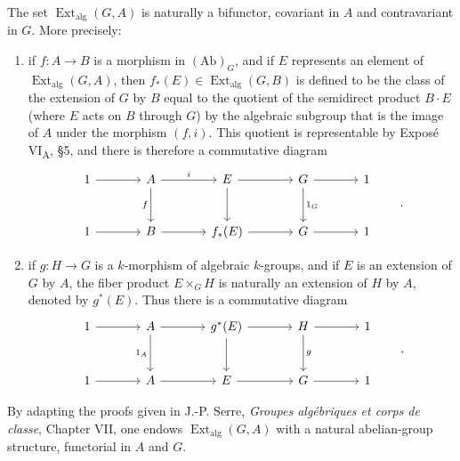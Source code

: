 The set \(\operatorname{Ext}_{\mathrm{alg}}(G,A)\) is naturally a
bifunctor, covariant in \(A\) and contravariant in \(G\).  More
precisely:
\begin{enumerate}
\item[(a)] 
  if \(f:A\to B\) is a morphism in \((\mathrm{Ab})_G\), and if
  \(E\) represents an element of
  \(\operatorname{Ext}_{\mathrm{alg}}(G,A)\), then
  \(f_*(E)\in\operatorname{Ext}_{\mathrm{alg}}(G,B)\) is defined
  to be the class of the extension of \(G\) by \(B\) equal to
  the quotient of the semidirect product \(B\mathbin{\cdot}E\)
  (where \(E\) acts on \(B\) through \(G\)) by the algebraic
  subgroup that is the image of \(A\) under the morphism
  \((f,i)\).  This quotient is representable by Exposé VI\textsubscript{A},
  \S5, and there is therefore a commutative diagram
  \[
  \begin{tikzcd}[column sep=large,row sep=large]
    1 \arrow[r] &
    A \arrow[r,"i"] \arrow[d,"f"'] &
    E \arrow[r] \arrow[d] &
    G \arrow[r] \arrow[d,"1_G"] &
    1 \\
    1 \arrow[r] &
    B \arrow[r] &
    f_*(E) \arrow[r] &
    G \arrow[r] &
    1
  \end{tikzcd}
  \qquad .
  \]

\item[(b)] 
  if \(g:H\to G\) is a \(k\)-morphism of algebraic
  \(k\)-groups, and if \(E\) is an extension of \(G\) by \(A\),
  the fiber product \(E\times_G H\) is naturally an extension
  of \(H\) by \(A\), denoted by \(g^*(E)\).  Thus there is a
  commutative diagram
  \[
  \begin{tikzcd}[column sep=large,row sep=large]
    1 \arrow[r] &
    A \arrow[r] \arrow[d,"1_A"'] &
    g^*(E) \arrow[r] \arrow[d] &
    H \arrow[r] \arrow[d,"g"] &
    1 \\
    1 \arrow[r] &
    A \arrow[r] &
    E \arrow[r] &
    G \arrow[r] &
    1
  \end{tikzcd}
  \qquad .
  \]
\end{enumerate}

By adapting the proofs given in J.-P. Serre,
\emph{Groupes algébriques et corps de classe}, Chapter VII, one
endows \(\operatorname{Ext}_{\mathrm{alg}}(G,A)\) with a natural
abelian-group structure, functorial in \(A\) and \(G\).


